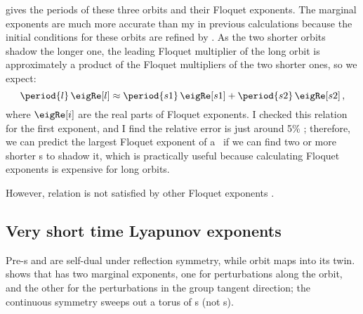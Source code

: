  gives the periods of
these three orbits and their Floquet exponents. The marginal exponents
are much more accurate than my in previous calculations because the
initial conditions for these orbits are refined by \LMa. As the two
shorter orbits shadow the longer one, the leading Floquet multiplier of
the long orbit is approximately a product of the Floquet multipliers of
the two shorter ones, so we expect:
	\begin{equation}
		\period{l}\,\eigRe[l]
         \approx \period{s1}\,\eigRe[s1]+\period{s2}\,\eigRe[s2]
    \,,
	\label{eq:relationorbits}
	\end{equation}
where $\eigRe[i]$ are the real parts of Floquet exponents. I checked this
relation for the first exponent, and I find the relative error is just
around 5\% ; therefore, we can predict the largest Floquet exponent of a
\po\ if we can find two or more shorter \po s to shadow it, which is
practically useful because calculating Floquet exponents is expensive
for long orbits.

However, relation  is not satisfied by
other Floquet exponents
.


\subsection{Very short time Lyapunov exponents}

Pre-\po s  and  are self-dual under reflection
symmetry, while orbit  maps into its twin.
 shows that 
has two marginal exponents, one for perturbations along the orbit, and
the other for the  perturbations in the group tangent direction;
the continuous symmetry sweeps out a torus of \po s (not \rpo s).

